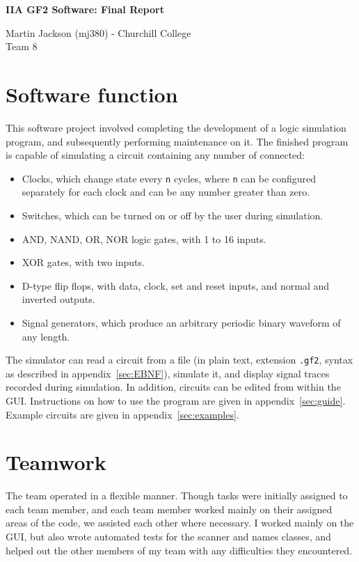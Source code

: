 \documentclass[a4paper,10pt]{article}
\begin{document}
\begin{center}
\LARGE \textbf{IIA GF2 Software: Final Report}

Martin Jackson (mj380) - Churchill College\\
Team 8
\end{center}

\tableofcontents{}\pagebreak

\section{Software function}
This software project involved completing the development of a logic simulation program, and subsequently performing maintenance on it. The finished program is capable of simulating a circuit containing any number of connected:
\begin{itemize}
\item Clocks, which change state every \texttt{n} cycles, where \texttt{n} can be configured separately for each clock and can be any number greater than zero.
\item Switches, which can be turned on or off by the user during simulation.
\item AND, NAND, OR, NOR logic gates, with 1 to 16 inputs.
\item XOR gates, with two inputs.
\item D-type flip flops, with data, clock, set and reset inputs, and normal and inverted outputs.
\item Signal generators, which produce an arbitrary periodic binary waveform of any length.
\end{itemize}

The simulator can read a circuit from a file (in plain text, extension \texttt{.gf2}, syntax as described in appendix~\ref{sec:EBNF}), simulate it, and display signal traces recorded during simulation. In addition, circuits can be edited from within the GUI. Instructions on how to use the program are given in appendix~\ref{sec:guide}. Example circuits are given in appendix~\ref{sec:examples}.

\section{Teamwork}
The team operated in a flexible manner. Though tasks were initially assigned to each team member, and each team member worked mainly on their assigned areas of the code, we assisted each other where necessary. I worked mainly on the GUI, but also wrote automated tests for the scanner and names classes, and helped out the other members of my team with any difficulties they encountered. 
\end{document}

